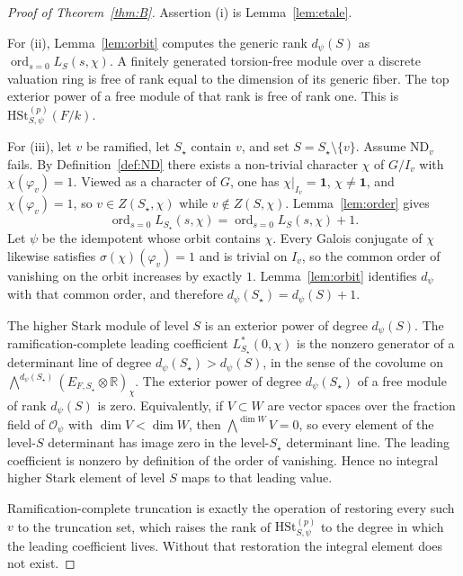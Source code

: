 \documentclass[11pt]{article}
\theoremstyle{plain}
\theoremstyle{definition}
\theoremstyle{remark}
\newcommand{\R}{\mathbb{R}}
\newcommand{\OK}{\mathcal{O}}
\newcommand{\ord}{\operatorname{ord}}
\newcommand{\triv}{\mathbf{1}}
\newcommand{\HSt}{\mathrm{HSt}}
\begin{document}
\begin{proof}[Proof of Theorem~\ref{thm:B}]
Assertion (i) is Lemma~\ref{lem:etale}.

For (ii), Lemma~\ref{lem:orbit} computes the generic rank $d_{\psi}(S)$ as $\ord_{s=0}L_S(s,\chi)$.
A finitely generated torsion-free module over a discrete valuation ring is free of rank equal to the dimension of its generic fiber.
The top exterior power of a free module of that rank is free of rank one.
This is $\HSt_{S,\psi}^{(p)}(F/k)$.

For (iii), let $v$ be ramified, let $S_{\star}$ contain $v$, and set $S=S_{\star}\setminus\{v\}$.
Assume $\mathrm{ND}_v$ fails.
By Definition~\ref{def:ND} there exists a non-trivial character $\chi$ of $G/I_v$ with $\chi(\varphi_v)=1$.
Viewed as a character of $G$, one has $\chi|_{I_v}=\triv$, $\chi\neq\triv$, and $\chi(\varphi_v)=1$, so $v\in Z(S_{\star},\chi)$ while $v\notin Z(S,\chi)$.
Lemma~\ref{lem:order} gives
\[
  \ord_{s=0}L_{S_{\star}}(s,\chi)
  =\ord_{s=0}L_S(s,\chi)+1.
\]
Let $\psi$ be the idempotent whose orbit contains $\chi$.
Every Galois conjugate of $\chi$ likewise satisfies $\sigma(\chi)(\varphi_v)=1$ and is trivial on $I_v$, so the common order of vanishing on the orbit increases by exactly $1$.
Lemma~\ref{lem:orbit} identifies $d_{\psi}$ with that common order, and therefore $d_{\psi}(S_{\star})=d_{\psi}(S)+1$.

The higher Stark module of level $S$ is an exterior power of degree $d_{\psi}(S)$.
The ramification-complete leading coefficient $L_{S_{\star}}^{*}(0,\chi)$ is the nonzero generator of a determinant line of degree $d_{\psi}(S_{\star})>d_{\psi}(S)$, in the sense of the covolume on $\bigwedge^{d_{\psi}(S_{\star})}(E_{F,S_{\star}}\otimes\R)_{\chi}$.
The exterior power of degree $d_{\psi}(S_{\star})$ of a free module of rank $d_{\psi}(S)$ is zero.
Equivalently, if $V\subset W$ are vector spaces over the fraction field of $\OK_{\psi}$ with $\dim V<\dim W$, then $\bigwedge^{\dim W}V=0$, so every element of the level-$S$ determinant has image zero in the level-$S_{\star}$ determinant line.
The leading coefficient is nonzero by definition of the order of vanishing.
Hence no integral higher Stark element of level $S$ maps to that leading value.

Ramification-complete truncation is exactly the operation of restoring every such $v$ to the truncation set, which raises the rank of $\HSt_{S,\psi}^{(p)}$ to the degree in which the leading coefficient lives.
Without that restoration the integral element does not exist.
\end{proof}
\end{document}
